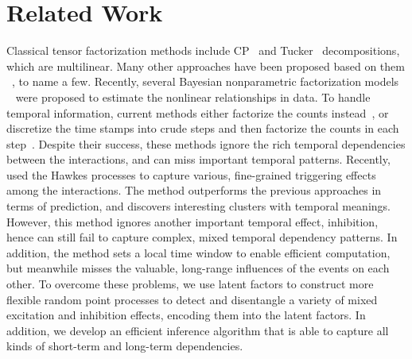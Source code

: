 \vspace{-0.1in}
\section{Related Work}
\vspace{-0.1in}
Classical tensor factorization methods  include CP~\citep{Harshman70parafac}  and Tucker~\citep{Tucker66} decompositions, which are multilinear. Many other approaches have been proposed based on them ~\citep{ShashuaH05,Chu09ptucker,sutskever2009modelling,acar2011scalable,hoff_2011_csda,kang2012gigatensor,YangDunson13Tensor,RaiDunson2014,choi2014dfacto,hu2015zero,raiscalable}, to name a  few. Recently, several Bayesian nonparametric factorization models ~\citep{XuYQ12,zhe2015scalable,zhe2016distributed} were proposed to estimate the nonlinear relationships in data. To handle temporal information, current methods  either factorize the counts instead~\citep{chi2012tensors,HaPlKo15,Hu2015CountTensor}, or  discretize the time stamps into crude steps and then factorize the counts in each step~\citep{xiong2010temporal, schein2015bayesian,Schein:2016:BPT:3045390.3045686}.
Despite their success, these methods ignore  the rich temporal dependencies between the interactions, and can miss important temporal patterns. Recently, \citet{zhe2018stochastic} used the Hawkes processes to capture various, fine-grained triggering effects among the interactions. The method outperforms the previous approaches in terms of prediction, and discovers interesting clusters with temporal meanings. However, this method ignores another important temporal effect, inhibition, hence can still fail to capture complex, mixed temporal dependency patterns. In addition, the method sets a local time window to enable efficient computation, but meanwhile misses the valuable, long-range influences of the events on each other. To overcome these problems, we use latent factors to construct more flexible random point processes to detect and disentangle a variety of mixed excitation and inhibition effects, encoding them into the latent factors. In addition, we develop an efficient inference algorithm that is able to capture all kinds of short-term and long-term dependencies. 

